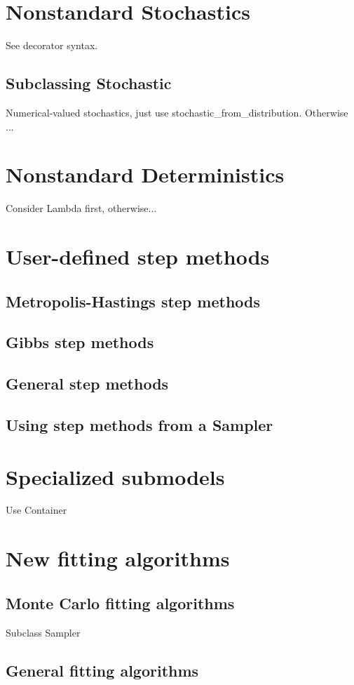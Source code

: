 \section{Nonstandard Stochastics}
See decorator syntax.

\subsection{Subclassing Stochastic}
Numerical-valued stochastics, just use stochastic_from_distribution. Otherwise ...

\section{Nonstandard Deterministics}
Consider Lambda first, otherwise...


\section{User-defined step methods}
\subsection{Metropolis-Hastings step methods}

\subsection{Gibbs step methods}

\subsection{General step methods}

\subsection{Using step methods from a Sampler}


\section{Specialized submodels}
Use Container


\section{New fitting algorithms}

\subsection{Monte Carlo fitting algorithms}
Subclass Sampler

\subsection{General fitting algorithms}